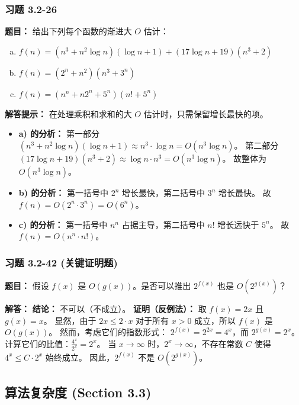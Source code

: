 \documentclass[11pt,UTF8]{article}
\begin{document}
\subsubsection*{习题 3.2-26}
\textbf{题目：} 给出下列每个函数的渐进大 $O$ 估计：
\begin{enumerate}[a)]
    \item $f(n) = (n^3 + n^2 \log n)(\log n + 1) + (17 \log n + 19)(n^3 + 2)$
    \item $f(n) = (2^n + n^2)(n^3 + 3^n)$
    \item $f(n) = (n^n + n 2^n + 5^n)(n! + 5^n)$
\end{enumerate}

\textbf{解答提示：} 在处理乘积和求和的大 $O$ 估计时，只需保留增长最快的项。
\begin{itemize}
    \item \textbf{a) 的分析：}
    第一部分 $(n^3 + n^2 \log n)(\log n + 1) \approx n^3 \cdot \log n = O(n^3 \log n)$。
    第二部分 $(17 \log n + 19)(n^3 + 2) \approx \log n \cdot n^3 = O(n^3 \log n)$。
    故整体为 $O(n^3 \log n)$。
    
    \item \textbf{b) 的分析：}
    第一括号中 $2^n$ 增长最快，第二括号中 $3^n$ 增长最快。
    故 $f(n) = O(2^n \cdot 3^n) = O(6^n)$。
    
    \item \textbf{c) 的分析：}
    第一括号中 $n^n$ 占据主导，第二括号中 $n!$ 增长远快于 $5^n$。
    故 $f(n) = O(n^n \cdot n!)$。
\end{itemize}

\subsubsection*{习题 3.2-42 (关键证明题)}
\textbf{题目：} 假设 $f(x)$ 是 $O(g(x))$。是否可以推出 $2^{f(x)}$ 也是 $O(2^{g(x)})$？

\textbf{解答：}
\textbf{结论：} 不可以（不成立）。
\textbf{证明（反例法）：}
取 $f(x) = 2x$ 且 $g(x) = x$。
显然，由于 $2x \le 2 \cdot x$ 对于所有 $x > 0$ 成立，所以 $f(x)$ 是 $O(g(x))$。
然而，考虑它们的指数形式：
$2^{f(x)} = 2^{2x} = 4^x$，而 $2^{g(x)} = 2^x$。
计算它们的比值：$\frac{4^x}{2^x} = 2^x$。
当 $x \to \infty$ 时，$2^x \to \infty$，不存在常数 $C$ 使得 $4^x \le C \cdot 2^x$ 始终成立。
因此，$2^{f(x)}$ 不是 $O(2^{g(x)})$。

\subsection{算法复杂度 (Section 3.3)}
\end{document}
